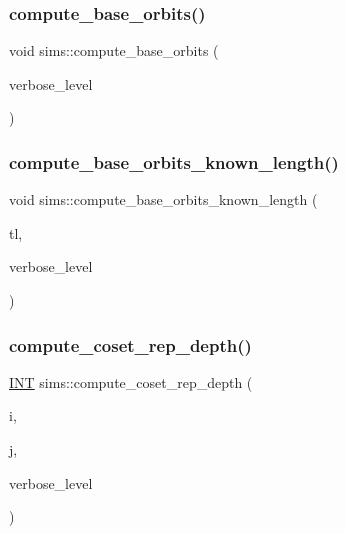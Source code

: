 \mbox{\label{classsims_ad39d4ca10a1cf40a440f92d948802388}} 
\subsubsection{\texorpdfstring{compute\+\_\+base\+\_\+orbits()}{compute\_base\_orbits()}}
{\footnotesize\ttfamily void sims\+::compute\+\_\+base\+\_\+orbits (\begin{DoxyParamCaption}\item[{\mbox{\hyperlink{galois_8h_a09fddde158a3a20bd2dcadb609de11dc}{I\+NT}}}]{verbose\+\_\+level }\end{DoxyParamCaption})}

\mbox{\label{classsims_a7f6b55695e29ce46f965ac4c87c31a06}} 
\subsubsection{\texorpdfstring{compute\+\_\+base\+\_\+orbits\+\_\+known\+\_\+length()}{compute\_base\_orbits\_known\_length()}}
{\footnotesize\ttfamily void sims\+::compute\+\_\+base\+\_\+orbits\+\_\+known\+\_\+length (\begin{DoxyParamCaption}\item[{\mbox{\hyperlink{galois_8h_a09fddde158a3a20bd2dcadb609de11dc}{I\+NT}} $\ast$}]{tl,  }\item[{\mbox{\hyperlink{galois_8h_a09fddde158a3a20bd2dcadb609de11dc}{I\+NT}}}]{verbose\+\_\+level }\end{DoxyParamCaption})}

\mbox{\label{classsims_abfeb782bd253f1df5253486afb120f6f}} 
\subsubsection{\texorpdfstring{compute\+\_\+coset\+\_\+rep\+\_\+depth()}{compute\_coset\_rep\_depth()}}
{\footnotesize\ttfamily \mbox{\hyperlink{galois_8h_a09fddde158a3a20bd2dcadb609de11dc}{I\+NT}} sims\+::compute\+\_\+coset\+\_\+rep\+\_\+depth (\begin{DoxyParamCaption}\item[{\mbox{\hyperlink{galois_8h_a09fddde158a3a20bd2dcadb609de11dc}{I\+NT}}}]{i,  }\item[{\mbox{\hyperlink{galois_8h_a09fddde158a3a20bd2dcadb609de11dc}{I\+NT}}}]{j,  }\item[{\mbox{\hyperlink{galois_8h_a09fddde158a3a20bd2dcadb609de11dc}{I\+NT}}}]{verbose\+\_\+level }\end{DoxyParamCaption})}

